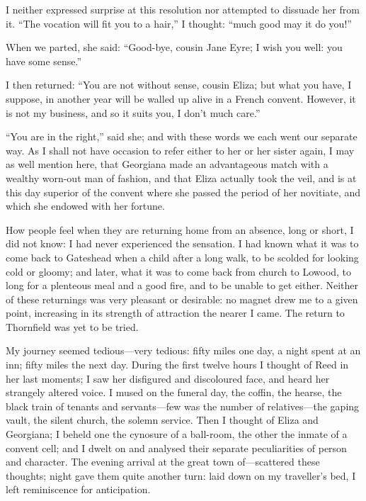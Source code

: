 I neither expressed surprise at this resolution nor attempted to
dissuade her from it. \enquote{The vocation will fit you to a hair,} I
thought: \enquote{much good may it do you!}

When we parted, she said: \enquote{Good-bye, cousin Jane Eyre; I wish
	you well: you have some sense.}

I then returned: \enquote{You are not without sense, cousin Eliza; but
	what you have, I suppose, in another year will be walled up alive in a
	French convent. However, it is not my business, and so it suits you, I
	don't much care.}

\enquote{You are in the right,} said she; and with these words we each
went our separate way. As I shall not have occasion to refer either to
her or her sister again, I may as well mention here, that Georgiana made
an advantageous match with a wealthy worn-out man of fashion, and that
Eliza actually took the veil, and is at this day superior of the convent
where she passed the period of her novitiate, and which she endowed with
her fortune.

How people feel when they are returning home from an absence, long or
short, I did not know: I had never experienced the sensation. I had
known what it was to come back to Gateshead when a child after a long
walk, to be scolded for looking cold or gloomy; and later, what it was
to come back from church to Lowood, to long for a plenteous meal and a
good fire, and to be unable to get either. Neither of these returnings
was very pleasant or desirable: no magnet drew me to a given point,
increasing in its strength of attraction the nearer I came. The return
to Thornfield was yet to be tried.

My journey seemed tedious---very tedious: fifty miles one day, a night
spent at an inn; fifty miles the next day. During the first twelve
hours I thought of \Mrs{} Reed in her last moments; I saw her disfigured
and discoloured face, and heard her strangely altered voice. I mused on
the funeral day, the coffin, the hearse, the black train of tenants and
servants---few was the number of relatives---the gaping vault, the
silent church, the solemn service. Then I thought of Eliza and
Georgiana; I beheld one the cynosure of a ball-room, the other the
inmate of a convent cell; and I dwelt on and analysed their separate
peculiarities of person and character. The evening arrival at the great
town of---scattered these thoughts; night gave them quite another turn:
laid down on my traveller's bed, I left reminiscence for anticipation.

